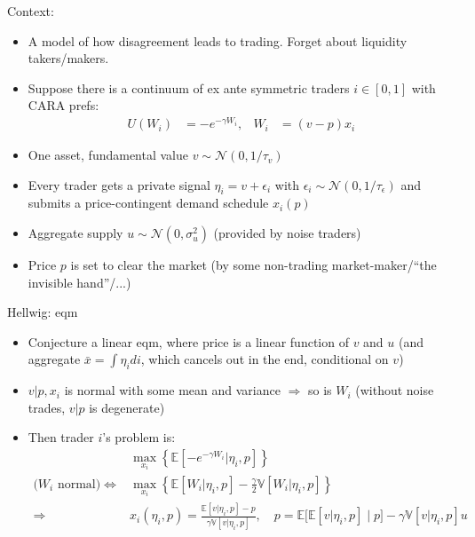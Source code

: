\documentclass[english,10pt
,aspectratio=169
]{beamer}
\begin{document}
\begin{frame}{Context: \cite{hellwig_aggregation_1980}}
	\begin{itemize}
		\item A model of how disagreement leads to trading. Forget about liquidity takers/makers.
		\item Suppose there is a continuum of ex ante symmetric traders $i \in [0,1]$ with CARA prefs:
		\begin{align*}
			U(W_i)&=-e^{-\gamma W_i}, &
			W_i & = (v - p){x_i}
		\end{align*}
		\item One asset, fundamental value $v \sim \mathcal{N}(0,1/\tau_v)$
		\item Every trader gets a private signal $\eta_i = v + \epsilon_i$ with $\epsilon_i \sim \mathcal{N}(0,1/\tau_\epsilon)$ and submits a price-contingent demand schedule $x_i(p)$
		\item Aggregate supply $u \sim \mathcal{N}(0, \sigma^2_u)$ (provided by noise traders)
		\item Price $p$ is set to clear the market (by some non-trading market-maker/``the invisible hand''/...)
	\end{itemize}
\end{frame}


\begin{frame}{Hellwig: eqm}
	\begin{itemize}
		\item Conjecture a linear eqm, where price is a linear function of $v$ and $u$ (and aggregate $\bar{x} = \int \eta_i di$, which cancels out in the end, conditional on $v$)
		\item $v | p,x_i$ is normal with some mean and variance $\Rightarrow$ so is $W_i$
		(without noise trades, $v|p$ is degenerate)
		
		\item Then trader $i$'s problem is:
		\begin{align*}
			&\max_{x_i} \left\{ \mathbb{E} \left[ -e^{-\gamma W_i} | \eta_i, p \right] \right\} 
			\\
			\text{($W_i$ normal)} \iff 
			&\max_{x_i} \left\{\mathbb{E} \left[ W_i| \eta_i, p\right] - \frac{\gamma}{2} \mathbb{V}\left[W_i| \eta_i, p \right] \right\}
			\\
			\Rightarrow & x_i(\eta_i,p) = \frac{\mathbb{E} \left[ v | \eta_i, p\right] - p}{\gamma \mathbb{V} \left[ v| \eta_i, p\right]}, \quad p= \mathbb{E} \Big[ \mathbb{E} [v|\eta_i,p] \mid p \Big] - \gamma \mathbb{V} \left[ v| \eta_i, p\right] u
		\end{align*}
	\end{itemize}
\end{frame}
\end{document}
